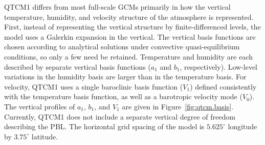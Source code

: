 QTCM1 differs from most full-scale GCMs primarily in how the vertical
temperature, humidity, and velocity structure of the atmosphere is
represented.  First, instead of representing the vertical structure
by finite-differenced levels, the model uses a Galerkin expansion
in the vertical.  The vertical basis functions are chosen according
to analytical solutions under convective quasi-equilibrium conditions,
so only a few need be retained.
Temperature and humidity are each described by separate
vertical basis functions ($a_1$ and $b_1$, respectively).
Low-level variations in the humidity basis
are larger than in the temperature basis.
For velocity, QTCM1 uses a single baroclinic basis function ($V_1$)
defined consistently with the temperature basis function,
as well as a barotropic velocity mode ($V_0$).
The vertical profiles of $a_1$, $b_1$, and $V_1$
are given in Figure~\ref{fig:qtcm.basis}.
Currently, QTCM1 does not include a separate
vertical degree of freedom describing the PBL.
The horizontal grid spacing of the model is 
$5.625^{\circ}$ longitude by $3.75^{\circ}$ latitude.


